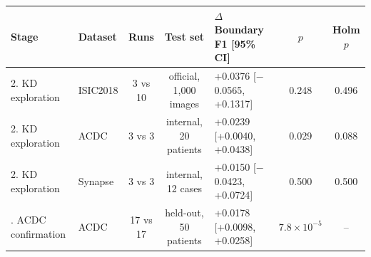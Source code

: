 \begin{tabular}{llcclcc}
\toprule
Stage & Dataset & Runs & Test set & $\Delta$ Boundary F1 [95\% CI] & $p$ & Holm $p$ \\
\midrule
2. KD exploration & ISIC2018 & 3 vs 10 & official, 1,000 images & +0.0376 [$-$0.0565, +0.1317] & 0.248 & 0.496 \\
2. KD exploration & ACDC & 3 vs 3 & internal, 20 patients & +0.0239 [+0.0040, +0.0438] & 0.029 & 0.088 \\
2. KD exploration & Synapse & 3 vs 3 & internal, 12 cases & +0.0150 [$-$0.0423, +0.0724] & 0.500 & 0.500 \\
\addlinespace
3. ACDC confirmation & ACDC & 17 vs 17 & held-out, 50 patients & +0.0178 [+0.0098, +0.0258] & $7.8\times10^{-5}$ & -- \\
\bottomrule
\end{tabular}
